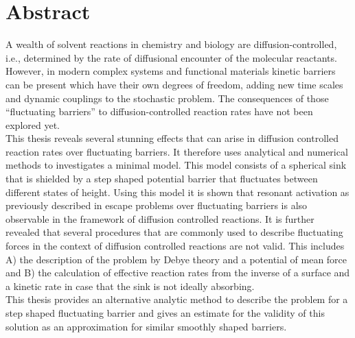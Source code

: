 \section*{Abstract}
A wealth of solvent reactions in chemistry and biology are diffusion-controlled, i.e., determined by the rate of diffusional encounter of the molecular reactants. However, in modern complex systems and functional materials kinetic barriers can be present which have their own degrees of freedom, adding new time scales and dynamic couplings to the stochastic problem. The consequences of those ``fluctuating barriers'' to diffusion-controlled reaction rates have not been explored yet. \\
This thesis reveals several stunning effects that can arise in diffusion controlled reaction rates over fluctuating barriers. It therefore uses analytical and numerical methods to investigates a minimal model. This model consists of a spherical sink that is shielded by a step shaped potential barrier that fluctuates between different states of height. Using this model it is shown that resonant activation as previously described in escape problems over fluctuating barriers is also observable in the framework of diffusion controlled reactions. It is further revealed that several procedures that are commonly used to describe fluctuating forces in the context of diffusion controlled reactions are not valid. This includes A) the description of the problem by Debye theory and a potential of mean force and B) the calculation of effective reaction rates from the inverse of a surface and a kinetic rate in case that the sink is not ideally absorbing. \\
This thesis provides an alternative analytic method to describe the problem for a step shaped fluctuating barrier and gives an estimate for the validity of this solution as an approximation for similar smoothly shaped barriers.
\newpage

